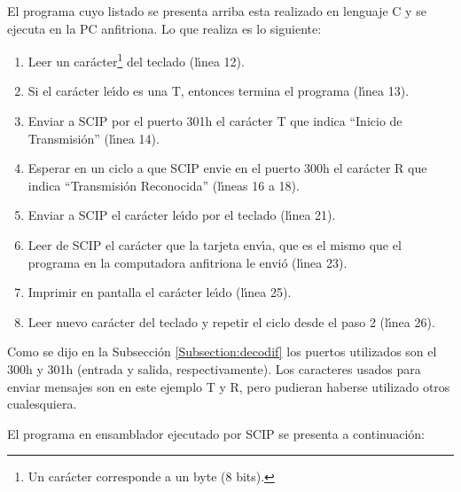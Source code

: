 El programa cuyo listado se presenta arriba esta realizado en lenguaje C y se ejecuta en la PC %
anfitriona. Lo que realiza es lo siguiente:

\begin{enumerate}
\item Leer un car\'acter\footnote{Un car\'acter corresponde a un byte (8 bits).} del %
teclado (l\'{\i}nea 12).
\item Si el car\'acter le\'{\i}do es una T, entonces termina el programa (l\'{\i}nea 13).
\item Enviar a SCIP por el puerto 301h el car\'acter T que indica ``Inicio de Transmisi\'on'' %
(l\'{\i}nea 14).
\item Esperar en un ciclo a que SCIP envie en el puerto 300h el car\'acter R que indica %
``Transmisi\'on Reconocida'' (l\'{\i}neas 16 a 18).
\item Enviar a SCIP el car\'acter le\'{\i}do por el teclado (l\'{\i}nea 21). 
\item Leer de SCIP el car\'acter que la tarjeta env\'{\i}a, que es el mismo que el programa %
en la computadora anfitriona le envi\'o (l\'{\i}nea 23).
\item Imprimir en pantalla el car\'acter le\'{\i}do (l\'{\i}nea 25).
\item Leer nuevo car\'acter del teclado y repetir el ciclo desde el paso 2 (l\'{\i}nea 26).
\end{enumerate}

Como se dijo en la Subsecci\'on \ref{Subsection:decodif} los puertos utilizados son el 300h y %
301h (entrada y salida, respectivamente). Los caracteres usados para enviar mensajes son en este %
ejemplo T y R, pero pudieran haberse utilizado otros cualesquiera.

El programa en ensamblador ejecutado por SCIP se presenta a con\-ti\-nua\-ci\-\'on:


